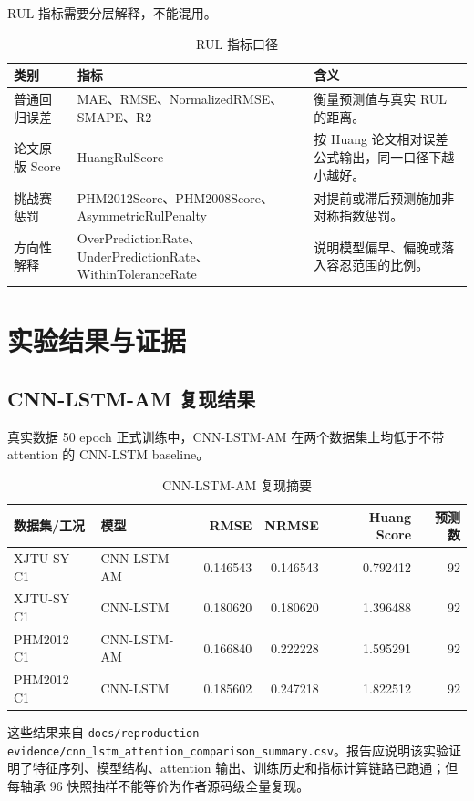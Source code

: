 \documentclass[UTF8,a4paper,12pt]{ctexart}
\newcommand{\code}[1]{\texttt{#1}}
\begin{document}
RUL 指标需要分层解释，不能混用。

\begin{table}[H]
\centering
\caption{RUL 指标口径}
\begin{tabularx}{\textwidth}{p{3.2cm}p{4.2cm}Y}
\toprule
类别 & 指标 & 含义 \\
\midrule
普通回归误差 & MAE、RMSE、NormalizedRMSE、SMAPE、R2 & 衡量预测值与真实 RUL 的距离。 \\
论文原版 Score & HuangRulScore & 按 Huang 论文相对误差公式输出，同一口径下越小越好。 \\
挑战赛惩罚 & PHM2012Score、PHM2008Score、AsymmetricRulPenalty & 对提前或滞后预测施加非对称指数惩罚。 \\
方向性解释 & OverPredictionRate、UnderPredictionRate、WithinToleranceRate & 说明模型偏早、偏晚或落入容忍范围的比例。 \\
\bottomrule
\end{tabularx}
\end{table}

\section{实验结果与证据}

\subsection{CNN-LSTM-AM 复现结果}

真实数据 50 epoch 正式训练中，CNN-LSTM-AM 在两个数据集上均低于不带 attention 的 CNN-LSTM baseline。

\begin{table}[H]
\centering
\caption{CNN-LSTM-AM 复现摘要}
\begin{tabularx}{\textwidth}{p{3.3cm}p{2.8cm}r r r r}
\toprule
数据集/工况 & 模型 & RMSE & NRMSE & Huang Score & 预测数 \\
\midrule
XJTU-SY C1 & CNN-LSTM-AM & 0.146543 & 0.146543 & 0.792412 & 92 \\
XJTU-SY C1 & CNN-LSTM & 0.180620 & 0.180620 & 1.396488 & 92 \\
PHM2012 C1 & CNN-LSTM-AM & 0.166840 & 0.222228 & 1.595291 & 92 \\
PHM2012 C1 & CNN-LSTM & 0.185602 & 0.247218 & 1.822512 & 92 \\
\bottomrule
\end{tabularx}
\end{table}

这些结果来自 \code{docs/reproduction-evidence/cnn\_lstm\_attention\_comparison\_summary.csv}。报告应说明该实验证明了特征序列、模型结构、attention 输出、训练历史和指标计算链路已跑通；但每轴承 96 快照抽样不能等价为作者源码级全量复现。
\end{document}
